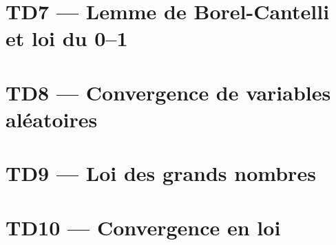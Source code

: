 \documentclass[french,a4paper,10pt]{article}
\begin{document}
    \newpage
    \section*{TD7 --- Lemme de Borel-Cantelli et loi du 0--1}\label{sec:TD7}
    \setcounter{section}{7}
    \setcounter{tdcounter}{0}
    

    \newpage
    \section*{TD8 --- Convergence de variables aléatoires}\label{sec:TD8}
    \setcounter{section}{8}
    \setcounter{tdcounter}{0}
    

    \newpage
    \section*{TD9 --- Loi des grands nombres}\label{sec:TD9}
    \setcounter{section}{9}
    \setcounter{tdcounter}{0}
    

    \newpage
    \section*{TD10 --- Convergence en loi}\label{sec:TD9}
    \setcounter{section}{10}
    \setcounter{tdcounter}{0}
    
\end{document}
